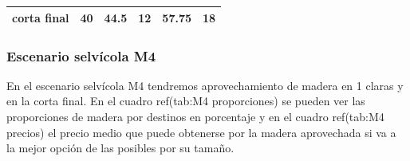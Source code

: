 \documentclass[]{article}
\begin{document}
\begin{longtable}[]{@{}lrrrrr@{}}
\begin{minipage}[t]{0.21\columnwidth}
\textbf{corta final}\strut
\end{minipage} & \begin{minipage}[t]{0.13\columnwidth}\raggedleft\strut
40\strut
\end{minipage} & \begin{minipage}[t]{0.13\columnwidth}\raggedleft\strut
44.5\strut
\end{minipage} & \begin{minipage}[t]{0.12\columnwidth}\raggedleft\strut
12\strut
\end{minipage} & \begin{minipage}[t]{0.13\columnwidth}\raggedleft\strut
57.75\strut
\end{minipage} & \begin{minipage}[t]{0.13\columnwidth}\raggedleft\strut
18\strut
\end{minipage}\tabularnewline
\bottomrule
\end{longtable}

\subsubsection{Escenario selvícola M4}\label{escenario-selvuxedcola-m4}

En el escenario selvícola M4 tendremos aprovechamiento de madera en 1
claras y en la corta final. En el cuadro ref(tab:M4 proporciones) se
pueden ver las proporciones de madera por destinos en porcentaje y en el
cuadro ref(tab:M4 precios) el precio medio que puede obtenerse por la
madera aprovechada si va a la mejor opción de las posibles por su
tamaño.
\end{document}
